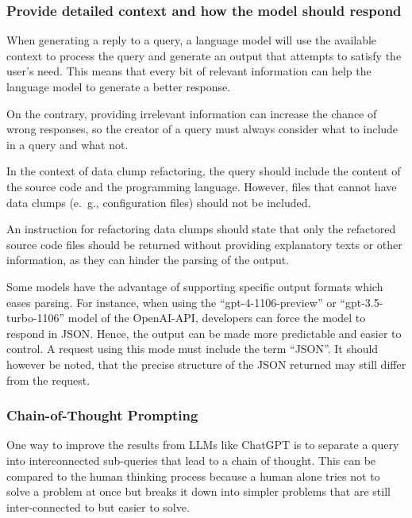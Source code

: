 {\subsubsection{Provide detailed context and how the model should respond}

When generating a reply to a query, a language model will use the available context to process the query and generate an output that attempts to satisfy the user's need. This means that every bit of relevant information can help the language model to generate a better response.

On the contrary, providing irrelevant information can increase the chance of wrong responses, so the creator of a query must always consider what to include in a query and what not. 

In the context of data clump refactoring, the query should include the content of the source code and the programming language. However, files that cannot have data clumps (e.~g., configuration files) should not be included.

An instruction for refactoring data clumps should state that only the refactored source code files should be returned without providing explanatory texts or other information, as they can hinder the parsing of the output. 

Some models have the advantage of supporting specific output formats which eases parsing.
For instance, when using the \enquote{gpt-4-1106-preview} or \enquote{gpt-3.5-turbo-1106} model of the OpenAI-\ac{API}, developers can force the model to respond in \ac{JSON}. Hence, the output can be made more predictable and easier to control. A request using this mode must include the term \enquote{\ac{JSON}}. It should however be noted, that the precise structure of the \ac{JSON} returned may still differ from the request. 


\subsubsection{Chain-of-Thought Prompting}\label{sec:chain of thought}

One way to improve the results from \acp{LLM} like ChatGPT is to separate a query into interconnected sub-queries that lead to a chain of thought. This can be compared to the human thinking process because a human alone tries not to solve a problem at once but breaks it down into simpler problems that are still inter-connected to but easier to solve.~\cite{Wei2022ChainOT}

}
